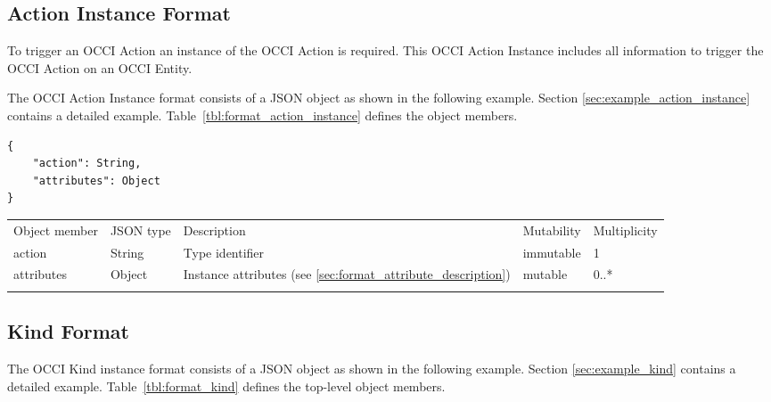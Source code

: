 \documentclass[10pt,a4paper]{article}
\begin{document}
\subsection{Action Instance Format}
\label{sec:format_action_instance}

To trigger an OCCI Action an instance of the OCCI Action is required. This
 OCCI Action Instance includes all information to trigger the OCCI Action on an
 OCCI Entity.

The OCCI Action Instance format consists of a JSON object as shown in the
following example. Section \ref{sec:example_action_instance} contains a detailed example.
Table~\ref{tbl:format_action_instance} defines the object members.
\begin{lstlisting}
{
    "action": String,
    "attributes": Object
}
\end{lstlisting}
 {
    \begin{tabularx}{\textwidth}{llXll}
    \toprule
    Object member & JSON type & Description & Mutability & Multiplicity \\
    \colrule
    action & String & Type identifier & immutable & 1 \\

    attributes & Object & Instance attributes (see
\ref{sec:format_attribute_description}) & mutable & 0..* \\
    \botrule
    \end{tabularx}
}

\subsection{Kind Format}
\label{sec:format_kind}

The OCCI Kind instance format consists of a JSON object as shown in the
following example. Section \ref{sec:example_kind} contains a detailed example.
Table~\ref{tbl:format_kind} defines the top-level object members.
\end{document}
